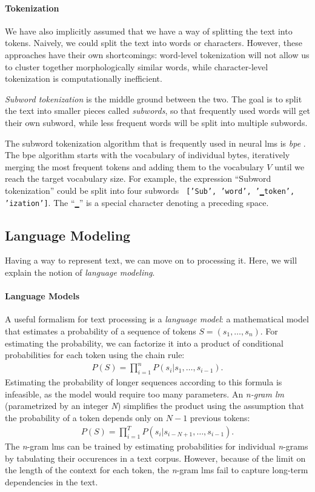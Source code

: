 \paragraph{Tokenization} We have also implicitly assumed that we have a way of splitting the text into tokens. Naively, we could split the text into words or characters. However, these approaches have their own shortcomings: word-level tokenization will not allow us to cluster together morphologically similar words, while character-level tokenization is computationally inefficient.

\emph{Subword tokenization}  is the middle ground between the two. The goal is to split the text into smaller pieces called \emph{subwords}, so that frequently used words will get their own subword, while less frequent words will be split into multiple subwords.

The subword tokenization algorithm that is frequently used in neural \acp{lm} is \emph{\ac{bpe}} \cite{sennrich2016neural}. The \ac{bpe} algorithm starts with the vocabulary of individual bytes, iteratively merging the most frequent tokens and adding them to the vocabulary $V$ until we reach the target vocabulary size. For example, the expression ``Subword tokenization'' could be split into four subwords \texttt{ ['Sub', 'word', '▁token', 'ization']}. The ``\texttt{▁}'' is a special character denoting a preceding space.


\subsection{Language Modeling}
Having a way to represent text, we can move on to processing it. Here, we will explain the notion of \emph{language modeling}.

\paragraph{Language Models} A useful formalism for text processing is a \emph{language model}: a mathematical model that estimates a probability of a sequence of tokens $S = (s_1, \ldots, s_n)$. For estimating the probability, we can factorize it into a product of conditional probabilities for each token using the chain rule:
\begin{align}
    P(S) = \prod_{i=1}^n P(s_i|s_1, \hdots, s_{i-1}).
\end{align}
Estimating the probability of longer sequences according to this formula is infeasible, as the model would require too many parameters. An \emph{\emph{n}-gram \ac{lm}} (parametrized by an integer \emph{N}) simplifies the product using the assumption that the probability of a token depends only on $N-1$ previous tokens:
\begin{align}
    P(S) = \prod_{i=1}^T P(s_i|s_{i-N+1}, \hdots,s_{i-1}).
\end{align}
The \emph{n}-gram \acp{lm} can be trained by estimating probabilities for individual \emph{n}-grams by tabulating their occurences in a text corpus. However, because of the limit on the length of the context for each token, the \emph{n}-gram \acp{lm} fail to capture long-term dependencies in the text.




